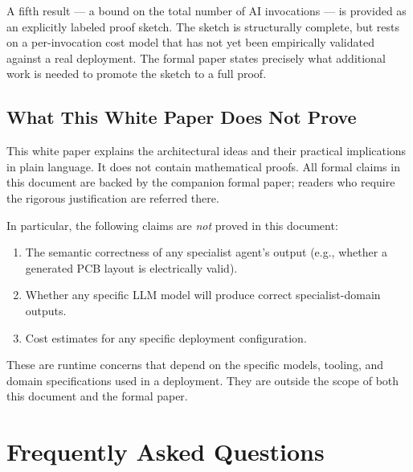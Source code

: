 \documentclass[12pt]{article}
\begin{document}
A fifth result --- a bound on the total number of AI invocations ---
is provided as an explicitly labeled proof sketch.
The sketch is structurally complete, but rests on a per-invocation
cost model that has not yet been empirically validated against a real
deployment.
The formal paper states precisely what additional work is needed to
promote the sketch to a full proof.

\subsection{What This White Paper Does Not Prove}

This white paper explains the architectural ideas and their practical
implications in plain language.
It does not contain mathematical proofs.
All formal claims in this document are backed by the companion formal
paper; readers who require the rigorous justification are referred there.

In particular, the following claims are \emph{not} proved in this
document:
\begin{enumerate}
    \item The semantic correctness of any specialist agent's output
          (e.g., whether a generated PCB layout is electrically valid).
    \item Whether any specific LLM model will produce correct
          specialist-domain outputs.
    \item Cost estimates for any specific deployment configuration.
\end{enumerate}
These are runtime concerns that depend on the specific models,
tooling, and domain specifications used in a deployment.
They are outside the scope of both this document and the formal paper.

\section{Frequently Asked Questions}
\label{sec:faq}
\end{document}
